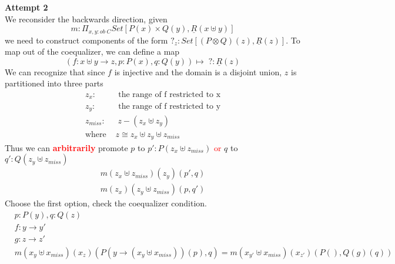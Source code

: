 \documentclass{article}
\newcommand{\red}[1]{\textcolor{red}{#1}}
\begin{document}
\textbf{Attempt 2}\\
We reconsider the backwards direction, given 
\[
    m : \Pi_{x , y : ob \;C} Set[P(x)\times Q(y), \underline{R}(x \uplus y)]
\]
we need to construct components of the form $?_z : Set[(P\otimes Q)(z),  \underline{R}(z)]$. 
To map out of the coequalizer, we can define a map
\[
    (f: x\uplus y \rightarrow z , p : P(x), q : Q(y)) \mapsto \; ? : \underline{R}(z)
\]
We can recognize that since $f$ is injective and the domain is a disjoint union, $z$ is partitioned into three parts
\begin{align*}
    z_x :& \textrm{ the range of f restricted to x}\\
    z_y :& \textrm{ the range of f restricted to y}\\
    z_{miss} :& \; z - (z_x \uplus z_y)\\
    \textrm{where } & z \cong z_x \uplus z_y \uplus z_{miss}
\end{align*}
Thus we can \red{\textbf{arbitrarily}} promote $p$ to $p' : P(z_x \uplus z_{miss})$ \red{or} $q$ to $q' : Q(z_y \uplus z_{miss})$
\begin{align*}
    m (z_x \uplus z_{miss})(z_y)(p' , q)\\
    m (z_x)(z_y \uplus z_{miss})(p , q')
\end{align*}
Choose the first option, check the coequalizer condition.
\begin{align*}
    &p : P(y) , q : Q(z)\\
    &f : y \rightarrow y' \\
    &g : z \rightarrow z'\\
    &m (x_{y} \uplus x_{miss})(x_{z})(P(y\rightarrow(x_{y} \uplus x_{miss}))(p) , q) 
    = m (x_{y'} \uplus x_{miss})(x_{z'})(P(),Q(g)(q))
\end{align*}



\end{document}
